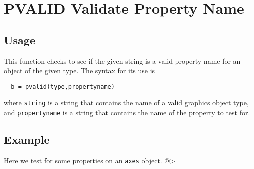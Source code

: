 \section{PVALID Validate Property Name}

\subsection{Usage}

This function checks to see if the given string is a valid
property name for an object of the given type.  The syntax
for its use is
\begin{verbatim}
  b = pvalid(type,propertyname)
\end{verbatim}
where \verb|string| is a string that contains the name of a 
 valid graphics object type, and
\verb|propertyname| is a string that contains the name of the
property to test for.
\subsection{Example}

Here we test for some properties on an \verb|axes| object.
@>
